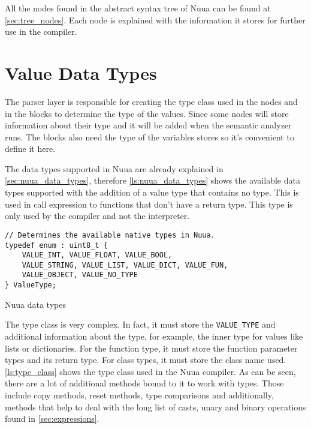 All the nodes found in the abstract syntax tree of Nuua can be found at \autoref{sec:tree_nodes}. Each node is explained with the information it
stores for further use in the compiler.

\section{Value Data Types}

The parser layer is responsible for creating the type class used in the nodes and in the blocks to determine the type of the values.
Since some nodes will store information about their type and it will be added when the semantic analyzer runs. The blocks also need
the type of the variables stores so it's convenient to define it here.

The data types supported in Nuua are already explained in \autoref{sec:nuua_data_types}, therefore \autoref{ls:nuua_data_types} shows the
available data types supported with the addition of a value type that contains no type. This is used in call expression to functions that don't have
a return type. This type is only used by the compiler and not the interpreter.

\begin{listing}[H]
\begin{verbatim}
// Determines the available native types in Nuua.
typedef enum : uint8_t {
    VALUE_INT, VALUE_FLOAT, VALUE_BOOL,
    VALUE_STRING, VALUE_LIST, VALUE_DICT, VALUE_FUN,
    VALUE_OBJECT, VALUE_NO_TYPE
} ValueType;
\end{verbatim}
\caption{Nuua data types}
\label{ls:nuua_data_types}
\end{listing}

The type class is very complex. In fact, it must store the \texttt{VALUE\_TYPE} and additional information about the type, for example,
the inner type for values like lists or dictionaries. For the function type, it must store the function parameter types and its return type. For class types,
it must store the class name used. \autoref{ls:type_class} shows the type class used in the Nuua compiler. As can be seen, there are a lot
of additional methods bound to it to work with types. Those include copy methods, reset methods, type comparisons and additionally,
methods that help to deal with the long list of casts, unary and binary operations found in \autoref{sec:expressions}.

